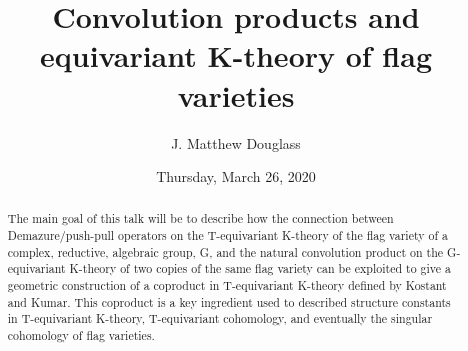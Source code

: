 \documentclass{UAmathtalk}
\author{J. Matthew Douglass}
\title{Convolution products and equivariant K-theory of flag varieties}
\date{Thursday, March 26, 2020}
\begin{document}
\maketitle

\begin{abstract}
The main goal of this talk will be to describe how the connection between Demazure/push-pull operators on the T-equivariant K-theory of the flag variety of a complex, reductive, algebraic group, G, and the natural convolution product on the G-equivariant K-theory of two copies of the same flag variety can be exploited to give a geometric construction of a coproduct in T-equivariant K-theory defined by Kostant and Kumar. This coproduct is a key ingredient used to described structure constants in T-equivariant K-theory, T-equivariant cohomology, and eventually the singular cohomology of flag varieties.
\end{abstract}
\end{document}
